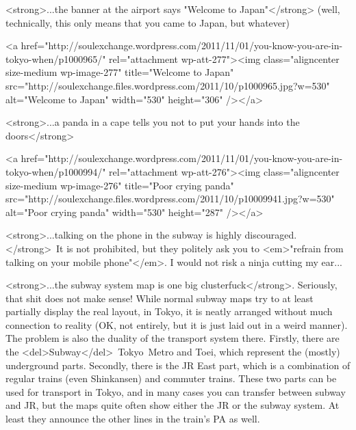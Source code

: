 \begin{post}
	\begin{content}
<strong>...the banner at the airport says "Welcome to Japan"</strong> (well, technically, this only means that you came to Japan, but whatever)



<a href="http://soulexchange.wordpress.com/2011/11/01/you-know-you-are-in-tokyo-when/p1000965/" rel="attachment wp-att-277"><img class="aligncenter size-medium wp-image-277" title="Welcome to Japan" src="http://soulexchange.files.wordpress.com/2011/10/p1000965.jpg?w=530" alt="Welcome to Japan" width="530" height="306" /></a>



<strong>...a panda in a cape tells you not to put your hands into the doors</strong>



<a href="http://soulexchange.wordpress.com/2011/11/01/you-know-you-are-in-tokyo-when/p1000994/" rel="attachment wp-att-276"><img class="aligncenter size-medium wp-image-276" title="Poor crying panda" src="http://soulexchange.files.wordpress.com/2011/10/p10009941.jpg?w=530" alt="Poor crying panda" width="530" height="287" /></a>



<strong>...talking on the phone in the subway is highly discouraged.</strong> It is not prohibited, but they politely ask you to <em>"refrain from talking on your mobile phone"</em>. I would not risk a ninja cutting my ear...



<strong>...the subway system map is one big clusterfuck</strong>. Seriously, that shit does not make sense! While normal subway maps try to at least partially display the real layout, in Tokyo, it is neatly arranged without much connection to reality (OK, not entirely, but it is just laid out in a weird manner). The problem is also the duality of the transport system there. Firstly, there are the <del>Subway</del> Tokyo Metro and Toei, which represent the (mostly) underground parts. Secondly, there is the JR East part, which is a combination of regular trains (even Shinkansen) and commuter trains. These two parts can be used for transport in Tokyo, and in many cases you can transfer between subway and JR, but the maps quite often show either the JR or the subway system. At least they announce the other lines in the train's PA as well.




\end{content}
\end{post}
